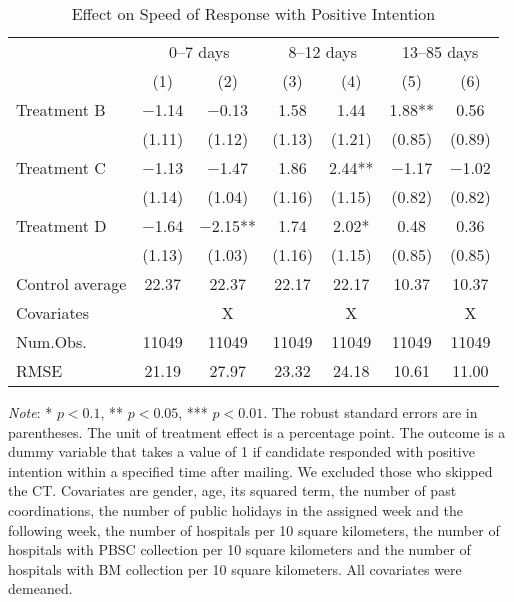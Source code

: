 \documentclass[12pt, a4paper]{article}
\begin{document}
\begin{table}[H]

\caption{\label{tab:lm-positive-time-decompose}Effect on Speed of Response with Positive Intention}
\centering
\fontsize{8}{10}\selectfont
\begin{threeparttable}
\begin{tabular}[t]{>{\raggedright\arraybackslash}p{20em}cccccc}
\toprule
\multicolumn{1}{c}{ } & \multicolumn{2}{c}{0--7 days} & \multicolumn{2}{c}{8--12 days} & \multicolumn{2}{c}{13--85 days} \\
\cmidrule(l{3pt}r{3pt}){2-3} \cmidrule(l{3pt}r{3pt}){4-5} \cmidrule(l{3pt}r{3pt}){6-7}
  & (1) & (2) & (3) & (4) & (5) & (6)\\
\midrule
Treatment B & \num{-1.14} & \num{-0.13} & \num{1.58} & \num{1.44} & \num{1.88}** & \num{0.56}\\
 & (\num{1.11}) & (\num{1.12}) & (\num{1.13}) & (\num{1.21}) & (\num{0.85}) & (\num{0.89})\\
Treatment C & \num{-1.13} & \num{-1.47} & \num{1.86} & \num{2.44}** & \num{-1.17} & \num{-1.02}\\
 & (\num{1.14}) & (\num{1.04}) & (\num{1.16}) & (\num{1.15}) & (\num{0.82}) & (\num{0.82})\\
Treatment D & \num{-1.64} & \num{-2.15}** & \num{1.74} & \num{2.02}* & \num{0.48} & \num{0.36}\\
 & (\num{1.13}) & (\num{1.03}) & (\num{1.16}) & (\num{1.15}) & (\num{0.85}) & (\num{0.85})\\
\midrule
Control average & 22.37 & 22.37 & 22.17 & 22.17 & 10.37 & 10.37\\
Covariates &  & X &  & X &  & X\\
Num.Obs. & \num{11049} & \num{11049} & \num{11049} & \num{11049} & \num{11049} & \num{11049}\\
RMSE & \num{21.19} & \num{27.97} & \num{23.32} & \num{24.18} & \num{10.61} & \num{11.00}\\
\bottomrule
\end{tabular}
\begin{tablenotes}
\item \emph{Note}: * $p < 0.1$, ** $p < 0.05$, *** $p < 0.01$. The robust standard errors are in parentheses. The unit of treatment effect is a percentage point. The outcome is a dummy variable that takes a value of 1 if candidate responded with positive intention within a specified time after mailing. We excluded those who skipped the CT. Covariates are gender, age, its squared term, the number of past coordinations, the number of public holidays in the assigned week and the following week, the number of hospitals per 10 square kilometers, the number of hospitals with PBSC collection per 10 square kilometers and the number of hospitals with BM collection per 10 square kilometers. All covariates were demeaned.
\end{tablenotes}
\end{threeparttable}
\end{table}
\end{document}
